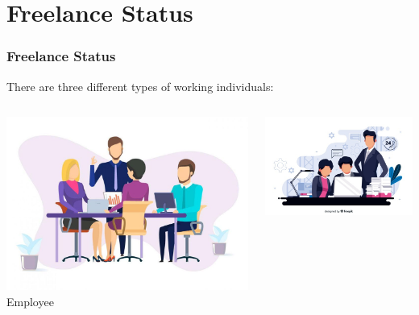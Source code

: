 \section[Freelance Status]{Freelance Status}
\begin{frame}
	\frametitle{Freelance Status}
	There are three different types of working individuals:
	\begin{columns}
	    \hspace*{0.5cm}
        \begin{column}{.4\textwidth}
            \begin{center} \includegraphics[width=\textwidth]{figures/employee.jpg}
            Employee
            \end{center}
        \end{column}
        \hspace*{-0.25cm}
        \begin{column}{.4\textwidth}
            \begin{center} \includegraphics[width=\textwidth]{figures/worker.jpg}

\end{center}
\end{column}
\end{columns}
\end{frame}
